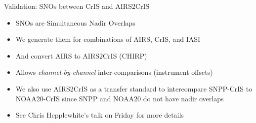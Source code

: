 \documentclass[10pt,t]{beamer}
\begin{document}
\begin{frame}[label={sec:org0f1c8df}]{Validation: SNOs between CrIS and AIRS2CrIS}
\begin{itemize}
\item SNOs are Simultaneous Nadir Overlaps
\item We generate them for combinations of AIRS, CrIS, and IASI
\item And convert AIRS to AIRS2CrIS (CHIRP)
\item Allows \emph{channel-by-channel} inter-comparisons (instrument offsets)
\item We also use AIRS2CrIS as a transfer standard to intercompare SNPP-CrIS to NOAA20-CrIS since SNPP and NOAA20 do not have nadir overlaps
\item See Chris Hepplewhite's talk on Friday for more details
\end{itemize}
\end{frame}
\end{document}
